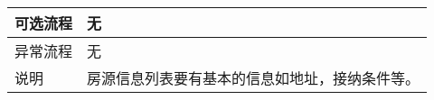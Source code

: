 \begin{table}[htbp]
\begin{tabular}{|l|l|l|l|}
        \hline
        可选流程                          & \multicolumn{3}{l|}{无 }                                                                                                                                                                 \\
        \hline
        异常流程                          & \multicolumn{3}{l|}{无}                                                                                                                                                                  \\
        \hline
        说明                              & \multicolumn{3}{l|}{房源信息列表要有基本的信息如地址，接纳条件等。 }                                                                                                                     \\
        \hline
    \end{tabular}
\end{table}

